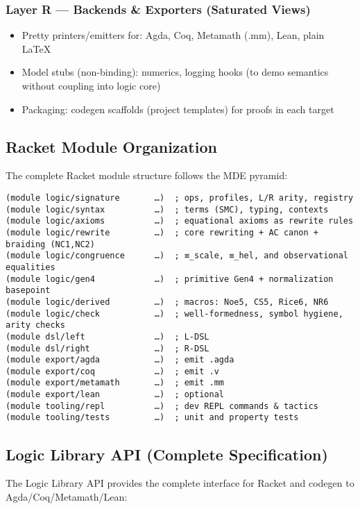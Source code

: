 \subsubsection{Layer R — Backends \& Exporters (Saturated Views)}
\begin{itemize}
\item Pretty printers/emitters for: Agda, Coq, Metamath (.mm), Lean, plain LaTeX
\item Model stubs (non-binding): numerics, logging hooks (to demo semantics without coupling into logic core)
\item Packaging: codegen scaffolds (project templates) for proofs in each target
\end{itemize}

\subsection{Racket Module Organization}

The complete Racket module structure follows the MDE pyramid:

\begin{verbatim}
(module logic/signature       …)  ; ops, profiles, L/R arity, registry
(module logic/syntax          …)  ; terms (SMC), typing, contexts
(module logic/axioms          …)  ; equational axioms as rewrite rules
(module logic/rewrite         …)  ; core rewriting + AC canon + braiding (NC1,NC2)
(module logic/congruence      …)  ; ≡_scale, ≡_hel, and observational equalities
(module logic/gen4            …)  ; primitive Gen4 + normalization basepoint
(module logic/derived         …)  ; macros: Noe5, CS5, Rice6, NR6
(module logic/check           …)  ; well-formedness, symbol hygiene, arity checks
(module dsl/left              …)  ; L-DSL
(module dsl/right             …)  ; R-DSL
(module export/agda           …)  ; emit .agda
(module export/coq            …)  ; emit .v
(module export/metamath       …)  ; emit .mm
(module export/lean           …)  ; optional
(module tooling/repl          …)  ; dev REPL commands & tactics
(module tooling/tests         …)  ; unit and property tests
\end{verbatim}

\subsection{Logic Library API (Complete Specification)}

The Logic Library API provides the complete interface for Racket and codegen to Agda/Coq/Metamath/Lean:

